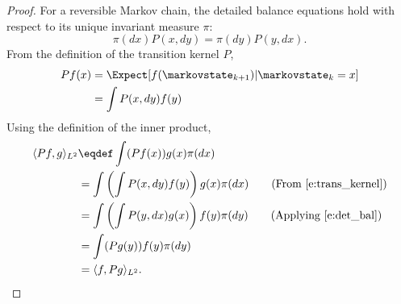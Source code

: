 \begin{proof}
	For a reversible Markov chain, the detailed balance equations hold with respect to its unique invariant measure $\pi$:
	\begin{equation}
	\pi(dx) P(x,dy ) = \pi(dy) P(y,dx).
	\label{e:det_bal}
	\end{equation}
	From the definition of the transition kernel $P$,
	\begin{equation}
	\begin{aligned}
	P f (x) & = \Expect [f(\markovstate_{k+1}) | \markovstate_k = x] \\
	& = \int P(x,dy) f(y)
	\label{e:trans_kernel}
	\end{aligned}
	\end{equation}
	Using the definition of the inner product,
	\[
	\begin{aligned}
	\langle P f, g \rangle_{L^2} & \eqdef \int (Pf(x)) g(x) \pi(dx) \\
	& = \int \left(\int P(x,dy)f(y)\right) g(x) \pi(dx)  \qquad (\text{From } \eqref{e:trans_kernel}) \\
	& = \int \left(\int P(y,dx) g(x) \right) f(y) \pi(dy) \qquad (\text {Applying } \eqref{e:det_bal})\\
	& = \int (P g(y)) f(y) \pi(dy) \\
	& = \langle f, P g \rangle_{L^2}.
	\end{aligned}
	\]
\end{proof}

